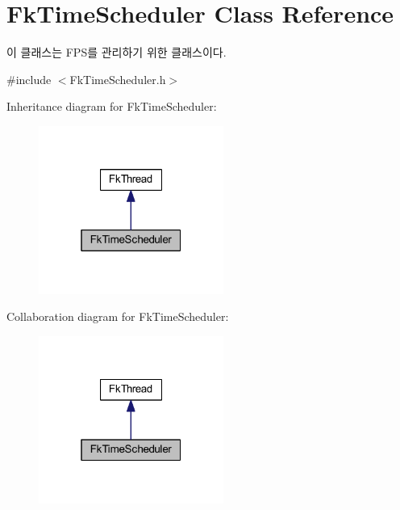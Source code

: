 \hypertarget{class_fk_time_scheduler}{}\section{Fk\+Time\+Scheduler Class Reference}
\label{class_fk_time_scheduler}


이 클래스는 F\+P\+S를 관리하기 위한 클래스이다.  




{\ttfamily \#include $<$Fk\+Time\+Scheduler.\+h$>$}



Inheritance diagram for Fk\+Time\+Scheduler\+:\nopagebreak
\begin{figure}[H]
\begin{center}
\leavevmode
\includegraphics[width=172pt]{class_fk_time_scheduler__inherit__graph}
\end{center}
\end{figure}


Collaboration diagram for Fk\+Time\+Scheduler\+:\nopagebreak
\begin{figure}[H]
\begin{center}
\leavevmode
\includegraphics[width=172pt]{class_fk_time_scheduler__coll__graph}
\end{center}
\end{figure}

